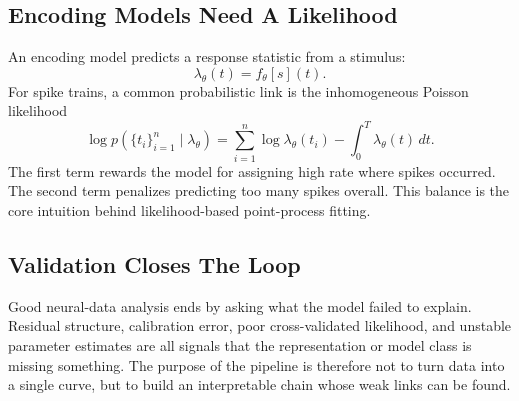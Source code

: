 \subsection{Encoding Models Need A Likelihood}

An encoding model predicts a response statistic from a stimulus:
\[
  \lambda_\theta(t)=f_\theta[s](t).
\]
For spike trains, a common probabilistic link is the inhomogeneous Poisson likelihood
\[
  \log p(\{t_i\}_{i=1}^n\mid \lambda_\theta)
  =
  \sum_{i=1}^{n}\log \lambda_\theta(t_i)
  -
  \int_0^T \lambda_\theta(t)\,d t.
\]
The first term rewards the model for assigning high rate where spikes occurred. The second term penalizes predicting too many spikes overall. This balance is the core intuition behind likelihood-based point-process fitting.

\subsection{Validation Closes The Loop}

Good neural-data analysis ends by asking what the model failed to explain. Residual structure, calibration error, poor cross-validated likelihood, and unstable parameter estimates are all signals that the representation or model class is missing something. The purpose of the pipeline is therefore not to turn data into a single curve, but to build an interpretable chain whose weak links can be found.
